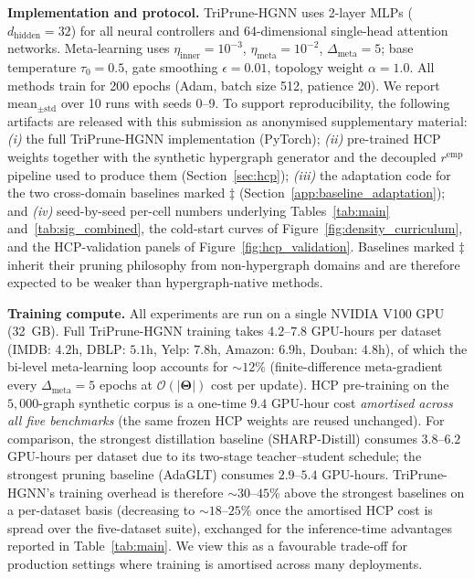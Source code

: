 \documentclass[10pt]{article}
\theoremstyle{plain}
\theoremstyle{definition}
\begin{document}
\textbf{Implementation and protocol.} TriPrune-HGNN uses 2-layer MLPs ($d_{\mathrm{hidden}}{=}32$) for all neural controllers and 64-dimensional single-head attention networks. Meta-learning uses $\eta_{\mathrm{inner}}{=}10^{-3}$,  $\eta_{\mathrm{meta}}{=}10^{-2}$, $\Delta_{\mathrm{meta}}{=}5$; base temperature $\tau_0{=}0.5$, gate smoothing $\epsilon{=}0.01$, topology weight $\alpha{=}1.0$. All methods train for 200 epochs (Adam, batch size 512, patience 20). We report mean$_{\pm \mathrm{std}}$ over 10 runs with seeds 0--9. To support reproducibility, the following artifacts are released with this submission as anonymised supplementary material: \emph{(i)} the full TriPrune-HGNN implementation (PyTorch); \emph{(ii)} pre-trained HCP weights together with the synthetic hypergraph generator and the decoupled $r^{\mathrm{emp}}$ pipeline used to produce them (Section~\ref{sec:hcp}); \emph{(iii)} the adaptation code for the two cross-domain baselines marked $\ddagger$ (Section~\ref{app:baseline_adaptation}); and \emph{(iv)} seed-by-seed per-cell numbers underlying Tables~\ref{tab:main} and~\ref{tab:sig_combined}, the cold-start curves of Figure~\ref{fig:density_curriculum}, and the HCP-validation panels of Figure~\ref{fig:hcp_validation}. Baselines marked $\ddagger$ inherit their pruning philosophy from non-hypergraph domains and are therefore expected to be weaker than hypergraph-native methods.

\textbf{Training compute.} All experiments are run on a single NVIDIA V100 GPU (32~GB). Full TriPrune-HGNN training takes $4.2$--$7.8$ GPU-hours per dataset (IMDB: $4.2$h, DBLP: $5.1$h, Yelp: $7.8$h, Amazon: $6.9$h, Douban: $4.8$h), of which the bi-level meta-learning loop accounts for $\sim\!12\%$ (finite-difference meta-gradient every $\Delta_{\mathrm{meta}}\!=\!5$ epochs at $\mathcal{O}(|\boldsymbol{\Theta}|)$ cost per update). HCP pre-training on the $5{,}000$-graph synthetic corpus is a one-time $9.4$ GPU-hour cost \emph{amortised across all five benchmarks} (the same frozen HCP weights are reused unchanged). For comparison, the strongest distillation baseline (SHARP-Distill) consumes $3.8$--$6.2$ GPU-hours per dataset due to its two-stage teacher--student schedule; the strongest pruning baseline (AdaGLT) consumes $2.9$--$5.4$ GPU-hours. TriPrune-HGNN's training overhead is therefore $\sim\!30$--$45\%$ above the strongest baselines on a per-dataset basis (decreasing to $\sim\!18$--$25\%$ once the amortised HCP cost is spread over the five-dataset suite), exchanged for the inference-time advantages reported in Table~\ref{tab:main}. We view this as a favourable trade-off for production settings where training is amortised across many deployments.
\end{document}
